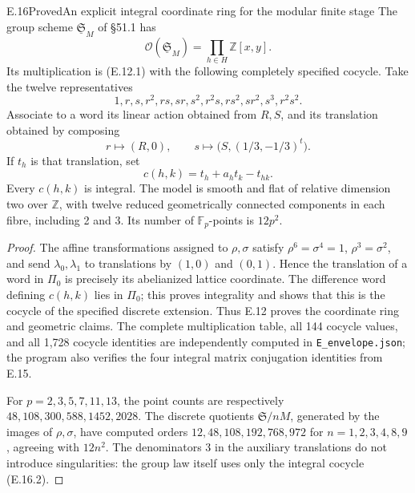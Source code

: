 \begin{statement}{E.16}{Proved}{An explicit integral coordinate ring for the modular finite stage}
The group scheme \(\underline{\mathfrak S}_M\) of \S51.1 has
\[
       \mathcal O(\underline{\mathfrak S}_M)
           =\prod_{h\in H}\mathbb Z[x,y].                       \tag{E.16.1}
\]
Its multiplication is (E.12.1) with the following completely
specified cocycle.  Take the twelve representatives
\[
 1,r,s,r^2,rs,sr,s^2,r^2s,rs^2,sr^2,s^3,r^2s^2.
\]
Associate to a word its linear action obtained from \(R,S\), and
its translation obtained by composing
\[
             r\mapsto(R,0),\qquad
             s\mapsto\bigl(S,(1/3,-1/3)^t\bigr).
\]
If \(t_h\) is that translation, set
\[
                    c(h,k)=t_h+a_ht_k-t_{hk}.                    \tag{E.16.2}
\]
Every \(c(h,k)\) is integral.  The model is smooth and flat of
relative dimension two over \(\mathbb Z\), with twelve reduced
geometrically connected components in each fibre, including 2
and 3.  Its number of \(\mathbb F_p\)-points is \(12p^2\).
\end{statement}
\begin{proof}
The affine transformations assigned to \(\rho,\sigma\) satisfy
\(\rho^6=\sigma^4=1\), \(\rho^3=\sigma^2\), and send
\(\lambda_0,\lambda_1\) to translations by \((1,0)\) and
\((0,1)\).  Hence the translation of a word in \(\Pi_0\) is
precisely its abelianized lattice coordinate.  The difference
word defining \(c(h,k)\) lies in \(\Pi_0\); this proves integrality
and shows that this is the cocycle of the specified discrete
extension.  Thus E.12 proves the coordinate ring and geometric
claims.  The complete multiplication table, all 144 cocycle
values, and all 1,728 cocycle identities are independently
computed in \texttt{E\_envelope.json}; the program also verifies
the four integral matrix conjugation identities from E.15.

For \(p=2,3,5,7,11,13\), the point counts are respectively
\(48,108,300,588,1452,2028\).  The discrete quotients
\(\mathfrak S/nM\), generated by the images of \(\rho,\sigma\),
have computed orders \(12,48,108,192,768,972\) for
\(n=1,2,3,4,8,9\), agreeing with \(12n^2\).
The denominators 3 in the auxiliary translations do not introduce
singularities: the group law itself uses only the integral
cocycle (E.16.2).
\end{proof}

